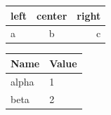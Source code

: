 \begin{tabular}{lcr}
  \hline
  left & center & right \\
  \hline
  a & b & c \\
\end{tabular}

\begin{tabular}{ll}
  \toprule
  Name & Value \\
  \midrule
  alpha & 1 \\
  beta  & 2 \\
  \bottomrule
\end{tabular}
